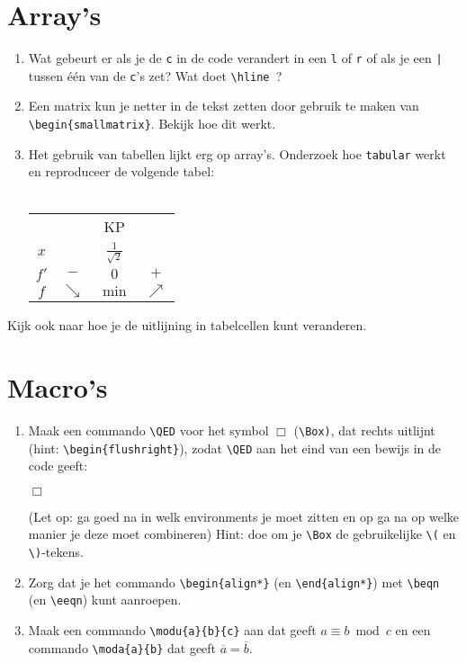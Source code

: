 \documentclass{article}
\newcommand{\beqn}{\begin{align*}}
\newcommand{\eeqn}{\end{align*}}
\begin{document}
\section{Array's}
	\begin{enumerate}
		\item Wat gebeurt er als je de \verb.c. in de code verandert in een \verb.l. of \verb.r. of als je een \verb.|. tussen \'e\'en van de \verb.c.'s zet? Wat doet \verb.\hline .?
		\item Een matrix kun je netter in de tekst zetten door gebruik te maken van \verb.\begin{smallmatrix}.. Bekijk hoe dit werkt.
		\item Het gebruik van tabellen lijkt erg op array's. Onderzoek hoe \verb.tabular. werkt en reproduceer de volgende tabel:\\
		\\
			\begin{tabular}{c|ccc}
		 		 		    & 			        & KP 			  & 				\\
				\(x\)		& 			        & \(\tfrac{1}{\sqrt{2}}\) 	& 				\\
				\hline
		 		\(f'\) 	& \(-\) 		    & \(0\) 		& \(+\) 			\\
		 		\(f\) 	& \(\searrow\)	& \(\min\)  & \(\nearrow\)		
			\end{tabular}
	\end{enumerate}
Kijk ook naar hoe je de uitlijning in tabelcellen kunt veranderen.
\section{Macro's}
\begin{enumerate}
	\item Maak een commando \verb.\QED. voor het symbol $\Box$ (\verb.\Box)., dat rechts uitlijnt (hint: \verb.\begin{flushright}.), zodat \verb.\QED. aan het eind van een bewijs in de code geeft:
		\begin{flushright}\(\Box\)\end{flushright}
(Let op: ga goed na in welk environments je moet zitten en op ga na op welke manier je deze moet combineren)
 Hint: doe om je \verb+\Box+ de gebruikelijke \verb+\(+ en \verb+\)+-tekens.
	\item Zorg dat je het commando \verb+\begin{align*}+ (en \verb+\end{align*}+) met \verb+\beqn+ (en \verb+\eeqn+) kunt aanroepen.
	\item Maak een commando \verb+\modu{a}{b}{c}+ aan dat geeft \(a \equiv b \bmod c\) en een commando \verb.\moda{a}{b}. dat geeft \(\overline{a} = \overline{b}\).
\end{enumerate}
\end{document}
